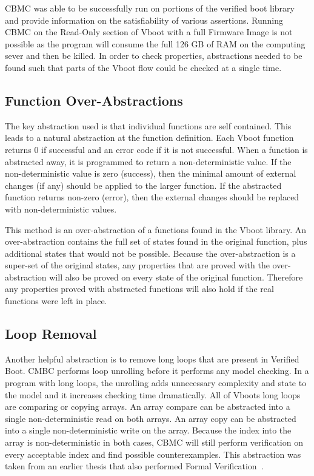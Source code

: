 CBMC was able to be successfully run on portions of the verified boot library and provide information on the satisfiability of various assertions.
Running CBMC on the Read-Only section of Vboot with a full Firmware Image is not possible as the program will consume the full 126 GB of RAM on the computing sever and then be killed.
In order to check properties, abstractions needed to be found such that parts of the Vboot flow could be checked at a single time.

\subsection{Function Over-Abstractions}

The key abstraction used is that individual functions are 
self contained.
This leads to a natural abstraction at the function definition.
Each Vboot function returns 0 if successful and an error code if it is not successful.
When a function is abstracted away, it is programmed to return a
non-deterministic value.
If the non-deterministic value is zero (success), then the minimal amount of external changes (if any) should be applied to the larger function.
If the abstracted function returns non-zero (error), then the external changes should be replaced with non-deterministic values.

This method is an over-abstraction of a functions found in the Vboot library.
An over-abstraction contains the full set of states found in the original function, plus additional states that would not be possible.
Because the over-abstraction is a super-set of the original states, any properties that are proved with the over-abstraction will also be proved on every state of the original function.
Therefore any properties proved with abstracted functions will also hold if the real functions were left in place.

\subsection{Loop Removal}

Another helpful abstraction is to remove long loops that are present in Verified
Boot.
CMBC performs loop unrolling before it performs any model checking. 
In a program with long loops, the unrolling adds unnecessary complexity and
state to the model and it increases checking time dramatically.
All of Vboots long loops are comparing or copying arrays.
An array compare can be abstracted into a single non-deterministic read on both
arrays.
An array copy can be abstracted into a single non-deterministic write on the
array.
Because the index into the array is non-deterministic in both cases, CBMC will
still perform verification on every acceptable index and find possible
counterexamples.
This abstraction was taken from an earlier thesis that also performed Formal
Verification~\cite{elane}. 

